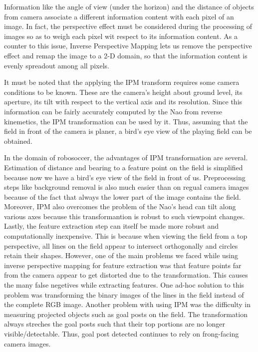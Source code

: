 \documentclass[	DIV=calc,%
							paper=a4,%
							fontsize=9pt,%
							twocolumn]{scrartcl}	 					%
\begin{document}
Information like the angle of view (under the horizon) and the distance of objects from camera associate a different information content with each pixel of an image. In fact, the perspective effect must be considered during the processing of images so as to weigh each pixel wit respect to its information content. As a counter to this issue, Inverse Perspective Mapping lets us remove the perspective effect and remap the image to a 2-D domain, so that the information content is evenly spreadout among all pixels\cite{IPMWeb}. 

It must be noted that the applying the IPM transform requires some camera conditions to be known. These are the camera's height about ground level, its aperture, its tilt with respect to the vertical axis and its resolution. Since this information can be fairly accurately computed by the Nao from reverse kinemetics, the IPM transformation can be used by it. Thus, assuming that the field in front of the camera is planer, a bird's eye view of the playing field can be obtained.

In the domain of robosoccer, the advantages of IPM transformation are several. Estimation of distance and bearing to a feature point on the field is simplified because now we have a bird's eye view of the field in front of us. Preprocessing steps like background removal is also much easier than on regual camera images because of the fact that always the lower part of the image contains the field. Moreover, IPM also overcomes the problem of the Nao's head can tilt along various axes because this transformantion is robust to such viewpoint changes. Lastly, the feature extraction step can itself be made more robust and computationally inexpensive. This is because when viewing the field from a top perspective, all lines on the field appear to intersect orthogonally and circles retain their shapes. However, one of the main problems we faced while using inverse perspective mapping for feature extraction was that feature points far from the camera appear to get distorted due to the transformation. This causes the many false negetives while extracting features. One ad-hoc solution to this problem was transforming the binary images of the lines in the field instead of the complete RGB image. Another problem with using IPM was the difficulty in measuring projected objects such as goal posts on the field. The transformation always streches the goal posts such that their top portions are no longer visible/detectable. Thus, goal post detected continues to rely on frong-facing camera images.
\end{document}
